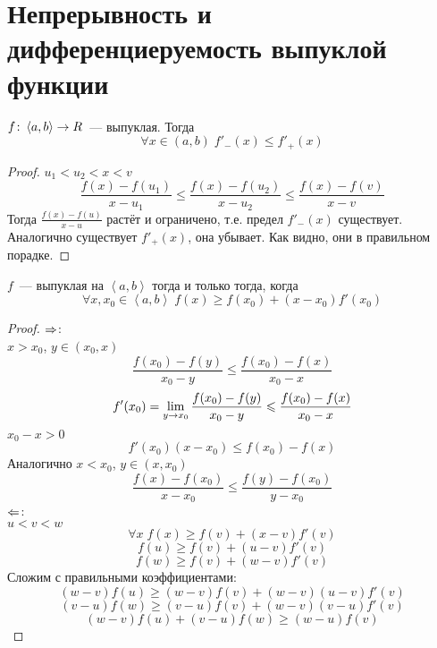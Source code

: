 ﻿\section{Непрерывность и дифференциеруемость выпуклой функции}

\begin{theorem}{}
$f\colon \left<a, b\right> \rightarrow R$~--- выпуклая. Тогда 
$$\forall x \in (a, b)\; f'_-(x) \leqslant f'_+(x)$$
\end{theorem}
\begin{proof}
$u_1 < u_2 < x < v$
$$\frac{f(x)-f(u_1)}{x-u_1} \leqslant \frac{f(x)-f(u_2)}{x-u_2} \leqslant \frac{f(x)-f(v)}{x-v}$$
Тогда $\frac{f(x)-f(u)}{x-u}$ растёт и ограничено, т.е. предел $f'_-(x)$ существует.
Аналогично существует $f'_+(x)$, она убывает. Как видно, они в правильном порадке.
\end{proof}

\begin{theorem}{}
$f$~--- выпуклая на $\left<a, b\right>$ тогда и только тогда, когда
$$\forall x, x_0 \in \left<a, b\right>\; f(x) \geqslant f(x_0) + (x-x_0)f'(x_0)$$
\end{theorem}
\begin{proof}
$\Rightarrow$:\\
$x > x_0$, $y \in (x_0, x)$
$$\frac{f(x_0) - f(y)}{x_0-y} \leqslant \frac{f(x_0)-f(x)}{x_0 - x}$$
$$f'(x_0) = \lim_{y \rightarrow x_0} \frac{f(x_0) - f(y)}{x_0-y} \leqslant \frac{f(x_0) - f(x)}{x_0 - x}$$
$x_0 - x > 0$
$$f'(x_0)(x-x_0) \leqslant f(x_0) - f(x)$$
Аналогично $x < x_0$, $y \in (x, x_0)$
$$\frac{f(x) - f(x_0)}{x-x_0} \leqslant \frac{f(y)-f(x_0)}{y - x_0}$$
$\Leftarrow$:\\
$u<v<w$
$$\forall x\; f(x) \geqslant f(v) + (x-v) f'(v)$$
$$f(u) \geqslant f(v) + (u-v) f'(v)$$
$$f(w) \geqslant f(v) + (w-v) f'(v)$$
Сложим с правильными коэффициентами:
$$(w-v)f(u) \geqslant (w-v) f(v) + (w-v)(u-v) f'(v)$$
$$(v-u)f(w) \geqslant (v-u) f(v) + (w-v)(v-u) f'(v)$$
$$(w-v)f(u) + (v-u) f(w) \geqslant (w-u) f(v)$$
\end{proof}
